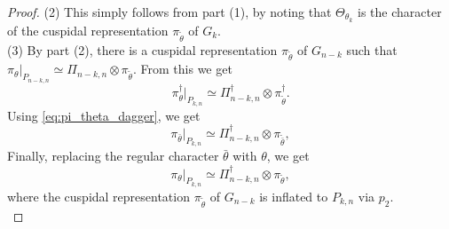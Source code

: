 \documentclass[reqno]{amsart}
\theoremstyle{definition}
\theoremstyle{remark}
\numberwithin{equation}{section}
\DeclareMathOperator{\Ind}{Ind}
\DeclareMathOperator{\St}{St}
\begin{document}
{{\begin{proof}
(2) This simply follows from part (1), by noting that $\Theta_{\theta_k}$ is the character of the cuspidal representation $\pi_{\tilde\theta}$ of $G_k$. \\

(3) By part (2), there is a cuspidal representation $\pi_{\tilde\theta}$ of $G_{n-k}$ such that  $\pi_\theta|_{P_{n-k,n}} \simeq \Pi_{n-k,n} \otimes \pi_{\tilde \theta}$. From this we get
\[ \pi_\theta^\dagger|_{P_{k,n}} \simeq \Pi_{n-k,n}^\dagger \otimes \pi_{\tilde \theta}^\dagger.\]
Using \eqref{eq:pi_theta_dagger}, we get 
\[ \pi_{\bar\theta}|_{P_{k,n}} \simeq \Pi_{n-k,n}^\dagger \otimes \pi_{\widetilde{\bar\theta}},\]
Finally, replacing the regular character $\bar\theta$  with $\theta$, we get 
\[ \pi_{\theta}|_{P_{k,n}} \simeq \Pi_{n-k,n}^\dagger \otimes \pi_{\tilde\theta},\]
where the cuspidal representation $\pi_{\tilde\theta}$ of $G_{n-k}$ is inflated to $P_{k,n}$ via $p_2$.\\



\end{proof}}}
\end{document}
